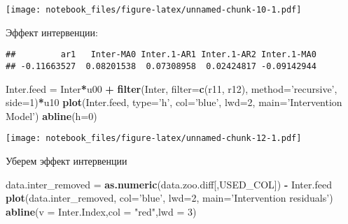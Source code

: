 \documentclass[
]{article}
\newenvironment{Shaded}{\begin{snugshade}}{\end{snugshade}}
\newcommand{\DataTypeTok}[1]{\textcolor[rgb]{0.13,0.29,0.53}{#1}}
\newcommand{\DecValTok}[1]{\textcolor[rgb]{0.00,0.00,0.81}{#1}}
\newcommand{\KeywordTok}[1]{\textcolor[rgb]{0.13,0.29,0.53}{\textbf{#1}}}
\newcommand{\NormalTok}[1]{#1}
\newcommand{\OperatorTok}[1]{\textcolor[rgb]{0.81,0.36,0.00}{\textbf{#1}}}
\newcommand{\StringTok}[1]{\textcolor[rgb]{0.31,0.60,0.02}{#1}}
\begin{document}
\texttt{[image: notebook\_files/figure-latex/unnamed-chunk-10-1.pdf]}

Эффект интервенции:

\begin{Shaded}
\end{Shaded}

\begin{verbatim}
##         ar1   Inter-MA0 Inter.1-AR1 Inter.1-AR2 Inter.1-MA0 
## -0.11663527  0.08201538  0.07308958  0.02424817 -0.09142944
\end{verbatim}

\begin{Shaded}
\begin{Highlighting}[]
\NormalTok{Inter.feed =}\StringTok{ }\NormalTok{Inter}\OperatorTok{*}\NormalTok{u00 }\OperatorTok{+}\StringTok{ }\KeywordTok{filter}\NormalTok{(Inter, }\DataTypeTok{filter=}\KeywordTok{c}\NormalTok{(r11, r12), }\DataTypeTok{method=}\StringTok{'recursive'}\NormalTok{, }\DataTypeTok{side=}\DecValTok{1}\NormalTok{)}\OperatorTok{*}\NormalTok{u10}
\KeywordTok{plot}\NormalTok{(Inter.feed, }\DataTypeTok{type=}\StringTok{'h'}\NormalTok{, }\DataTypeTok{col=}\StringTok{'blue'}\NormalTok{, }\DataTypeTok{lwd=}\DecValTok{2}\NormalTok{, }\DataTypeTok{main=}\StringTok{'Intervention Model'}\NormalTok{)}
\KeywordTok{abline}\NormalTok{(}\DataTypeTok{h=}\DecValTok{0}\NormalTok{)}
\end{Highlighting}
\end{Shaded}

\texttt{[image: notebook\_files/figure-latex/unnamed-chunk-12-1.pdf]}

Уберем эффект интервенции

\begin{Shaded}
\begin{Highlighting}[]
\NormalTok{data.inter_removed =}\StringTok{ }\KeywordTok{as.numeric}\NormalTok{(data.zoo.diff[,USED_COL]) }\OperatorTok{-}\StringTok{ }\NormalTok{Inter.feed}
\KeywordTok{plot}\NormalTok{(data.inter_removed, }\DataTypeTok{col=}\StringTok{'blue'}\NormalTok{, }\DataTypeTok{lwd=}\DecValTok{2}\NormalTok{, }\DataTypeTok{main=}\StringTok{'Intervention residuals'}\NormalTok{)}
\KeywordTok{abline}\NormalTok{(}\DataTypeTok{v =}\NormalTok{ Inter.Index,}\DataTypeTok{col =} \StringTok{"red"}\NormalTok{,}\DataTypeTok{lwd =} \DecValTok{3}\NormalTok{)}
\end{Highlighting}
\end{Shaded}
\end{document}
